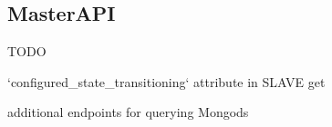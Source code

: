 \subsection{MasterAPI}

TODO

`configured_state_transitioning` attribute in SLAVE get

additional endpoints for querying Mongods


